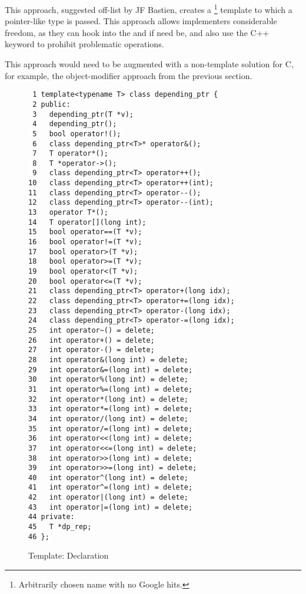 This approach, suggested off-list by JF Bastien, creates a
\footnote{
	Arbitrarily chosen name with no Google hits.}
template to which a pointer-like type is passed.
This approach allows implementers considerable freedom, as they can
hook into the \co{->} and \co{*} if need be, and also use the C++
 keyword to prohibit problematic operations.

This approach would need to be augmented with a non-template solution
for C, for example, the object-modifier approach from
the previous section.

\begin{figure}[tbp]
{ \scriptsize
\begin{verbatim}
 1 template<typename T> class depending_ptr {
 2 public:
 3   depending_ptr(T *v);
 4   depending_ptr();
 5   bool operator!();
 6   class depending_ptr<T>* operator&();
 7   T operator*();
 8   T *operator->();
 9   class depending_ptr<T> operator++();
10   class depending_ptr<T> operator++(int);
11   class depending_ptr<T> operator--();
12   class depending_ptr<T> operator--(int);
13   operator T*();
14   T operator[](long int);
15   bool operator==(T *v);
16   bool operator!=(T *v);
17   bool operator>(T *v);
18   bool operator>=(T *v);
19   bool operator<(T *v);
20   bool operator<=(T *v);
21   class depending_ptr<T> operator+(long idx);
22   class depending_ptr<T> operator+=(long idx);
23   class depending_ptr<T> operator-(long idx);
24   class depending_ptr<T> operator-=(long idx);
25   int operator~() = delete;
26   int operator+() = delete;
27   int operator-() = delete;
28   int operator&(long int) = delete;
29   int operator&=(long int) = delete;
30   int operator%(long int) = delete;
31   int operator%=(long int) = delete;
32   int operator*(long int) = delete;
33   int operator*=(long int) = delete;
34   int operator/(long int) = delete;
35   int operator/=(long int) = delete;
36   int operator<<(long int) = delete;
37   int operator<<=(long int) = delete;
38   int operator>>(long int) = delete;
39   int operator>>=(long int) = delete;
40   int operator^(long int) = delete;
41   int operator^=(long int) = delete;
42   int operator|(long int) = delete;
43   int operator|=(long int) = delete;
44 private:
45   T *dp_rep;
46 };
\end{verbatim}
}
\caption{Template: Declaration}
\label{fig:Template: Declaration}
\end{figure}

